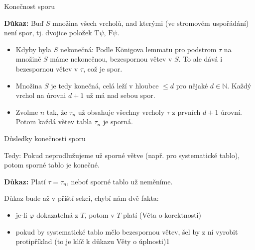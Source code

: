 \documentclass{beamer}
\begin{document}
\begin{frame}{Konečnost sporu}


    \textbf{Důkaz:} 
    Buď $S$ množina všech vrcholů, nad kterými (ve stromovém uspořádání) není spor, tj. dvojice položek $\mathrm{T}\psi$, $\mathrm{F}\psi$.

    \begin{itemize}
        \item \alert{Kdyby byla $S$ nekonečná:} Podle Königova lemmatu pro podstrom $\tau$ na množině $S$ máme nekonečnou, bezespornou větev v $S$. To ale dává i \alert{bezespornou větev v $\tau$}, což je spor. 
    
        \item \alert{Množina $S$ je tedy konečná,} celá leží v hloubce $\leq d$ pro nějaké $d\in\mathbb N$. Každý vrchol \alert{na úrovni $d+1$ už má nad sebou spor}. 
        
        \item Zvolme $n$ tak, že $\tau_n$ už obsahuje všechny vrcholy $\tau$ z prvních $d+1$ úrovní. Potom každá větev tabla $\tau_n$ je sporná.\hfill\qedsymbol
    \end{itemize}    

\end{frame}


\begin{frame}{Důsledky konečnosti sporu}
    
    Tedy: Pokud neprodlužujeme už sporné větve (např. pro systematické tablo), potom sporné tablo je konečné.
    \medskip


    \textbf{Důkaz:} 
    Platí $\tau=\tau_n$, neboť sporné tablo už neměníme.\hfill\qedsymbol   

    \bigskip


    Důkaz bude až v příští sekci, chybí nám dvě fakta:
    \begin{itemize}
        \item je-li $\varphi$ dokazatelná z $T$, potom v $T$ platí (Věta o korektnosti)
        \item pokud by systematické tablo mělo bezespornou větev, šel by z ní vyrobit protipříklad (to je klíč k důkazu Věty o úplnosti)1
    \end{itemize}

\end{frame}
\end{document}
